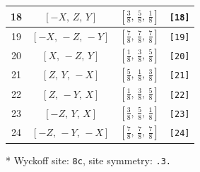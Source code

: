 \documentclass[fleqn,8pt]{jsarticle}
\begin{document}
\begin{longtable}{cccc}
18 & $\left[ - X,\, Z,\, Y \right]$ & $\left[ \frac{3}{8},\, \frac{5}{8},\, \frac{1}{8} \right]$ & {\tt [18]} \\ \hline
19 & $\left[ - X,\, - Z,\, - Y \right]$ & $\left[ \frac{7}{8},\, \frac{7}{8},\, \frac{7}{8} \right]$ & {\tt [19]} \\ \hline
20 & $\left[ X,\, - Z,\, Y \right]$ & $\left[ \frac{1}{8},\, \frac{3}{8},\, \frac{5}{8} \right]$ & {\tt [20]} \\ \hline
21 & $\left[ Z,\, Y,\, - X \right]$ & $\left[ \frac{5}{8},\, \frac{1}{8},\, \frac{3}{8} \right]$ & {\tt [21]} \\ \hline
22 & $\left[ Z,\, - Y,\, X \right]$ & $\left[ \frac{1}{8},\, \frac{3}{8},\, \frac{5}{8} \right]$ & {\tt [22]} \\ \hline
23 & $\left[ - Z,\, Y,\, X \right]$ & $\left[ \frac{3}{8},\, \frac{5}{8},\, \frac{1}{8} \right]$ & {\tt [23]} \\ \hline
24 & $\left[ - Z,\, - Y,\, - X \right]$ & $\left[ \frac{7}{8},\, \frac{7}{8},\, \frac{7}{8} \right]$ & {\tt [24]} \\
\end{longtable}
* Wyckoff site: {\tt 8c}, site symmetry: {\tt .3.}
\renewcommand{\arraystretch}{1.2}
\end{document}
